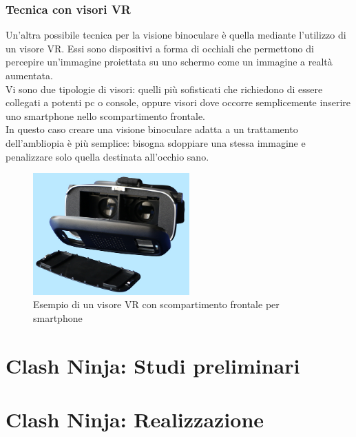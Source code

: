 \documentclass[12pt,a4paper,openright,twoside]{book}
\begin{document}
	\subsection{Tecnica con visori VR}
	Un'altra possibile tecnica per la visione binoculare è quella mediante l'utilizzo di un visore VR. Essi sono dispositivi a forma di occhiali che permettono di percepire un'immagine proiettata su uno schermo come un immagine a realtà aumentata.\\
	Vi sono due tipologie di visori: quelli più sofisticati che richiedono di essere collegati a potenti pc o console, oppure visori dove occorre semplicemente inserire uno smartphone nello scompartimento frontale.\\
	In questo caso creare una visione binoculare adatta a un trattamento dell'ambliopia è più semplice: bisogna sdoppiare una stessa immagine e penalizzare solo quella destinata all'occhio sano.
	\begin{figure}[h]
		\centering   	
		\includegraphics[width=60mm]{visorevr.jpg}
		\caption{Esempio di un visore VR con scompartimento frontale per smartphone}
		\label{fig:headsetvr}
	\end{figure}
	\chapter{Clash Ninja: Studi preliminari} 
	\chapter{Clash Ninja: Realizzazione}   
    
    
\end{document}
